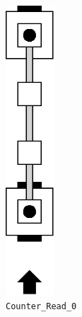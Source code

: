 \begin{figure}[H]
    \centering
    \begin{subfigure}[t]{0.2\textwidth}
        \centering
        \includegraphics[width=0.2\textwidth]{counter_read_0}
        \caption{\label{fig:counter_read_0} {\tt Counter\_Read\_0}}
    \end{subfigure}%
    ~
    \begin{subfigure}[t]{0.2\textwidth}
        \centering

\end{subfigure}
\end{figure}
